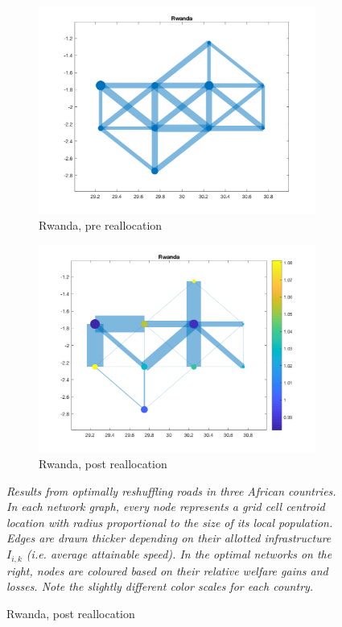 \documentclass[11pt, oneside]{article}   	%
\newcommand{\mysubcaption}[1]{
\justify
\begin{spacing}{0.7}
\textit{\footnotesize #1}
\end{spacing}}
\begin{document}
{\begin{figure}[]
\begin{subfigure}[c]{0.45\textwidth}
\includegraphics[width=\textwidth, trim={2cm 0cm 1.5cm 0cm},clip]{../../Build/output/Matlab_graphs/Nicer_graphs/Rwanda_stat.png}
\caption{Rwanda, pre reallocation}
\label{fig:rwanda_pre}
\end{subfigure}
\begin{subfigure}[c]{0.45\textwidth}
\includegraphics[width=\textwidth, trim={2cm 0cm 1.5cm 0cm},clip]{../../Build/output/Matlab_graphs/Nicer_graphs/Rwanda_opt.png}
\caption{Rwanda, post reallocation}
\label{fig:rwanda_post}
\end{subfigure}

\mysubcaption{Results from optimally reshuffling roads in three African countries. In each network graph, every node represents a grid cell centroid location with radius proportional to the size of its local population. Edges are drawn thicker depending on their allotted infrastructure $I_{i,k}$ (i.e. average attainable speed). In the optimal networks on the right, nodes are coloured based on their relative welfare gains and losses. Note the slightly different color scales for each country.}
\label{fig:Reallocations}
\end{figure}
\vfill
\clearpage
}
\end{document}
